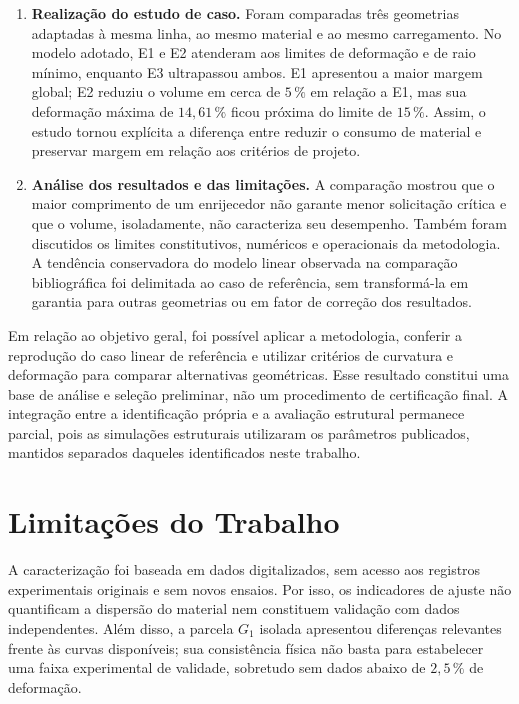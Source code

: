 \documentclass[arial,centeredequations,english,brazilian,oneside,section=TITLE]{ifes8}
\begin{document}
\begin{enumerate}
  \item \textbf{Realização do estudo de caso.} Foram comparadas três
  geometrias adaptadas à mesma linha, ao mesmo material e ao mesmo
  carregamento. No modelo adotado, E1 e E2 atenderam aos limites de
  deformação e de raio mínimo, enquanto E3 ultrapassou ambos. E1
  apresentou a maior margem global; E2 reduziu o volume em cerca de
  $5\,\%$ em relação a E1, mas sua deformação máxima de $14{,}61\,\%$
  ficou próxima do limite de $15\,\%$. Assim, o estudo tornou explícita
  a diferença entre reduzir o consumo de material e preservar margem
  em relação aos critérios de projeto.

  \item \textbf{Análise dos resultados e das limitações.} A comparação
  mostrou que o maior comprimento de um enrijecedor não garante menor
  solicitação crítica e que o volume, isoladamente, não caracteriza
  seu desempenho. Também foram discutidos os limites constitutivos,
  numéricos e operacionais da metodologia. A tendência conservadora
  do modelo linear observada na comparação bibliográfica foi
  delimitada ao caso de referência, sem transformá-la em garantia
  para outras geometrias ou em fator de correção dos resultados.
\end{enumerate}

Em relação ao objetivo geral, foi possível aplicar a metodologia,
conferir a reprodução do caso linear de referência e utilizar critérios
de curvatura e deformação para comparar alternativas geométricas. Esse
resultado constitui uma base de análise e seleção preliminar, não um
procedimento de certificação final. A integração entre a identificação
própria e a avaliação estrutural permanece parcial, pois as simulações
estruturais utilizaram os parâmetros publicados, mantidos separados
daqueles identificados neste trabalho.

\section{Limitações do Trabalho}
\label{sec:limitacoes-trabalho}

A caracterização foi baseada em dados digitalizados, sem acesso aos
registros experimentais originais e sem novos ensaios. Por isso, os
indicadores de ajuste não quantificam a dispersão do material nem
constituem validação com dados independentes. Além disso, a parcela
$G_1$ isolada apresentou diferenças relevantes frente às curvas
disponíveis; sua consistência física não basta para estabelecer uma
faixa experimental de validade, sobretudo sem dados abaixo de
$2{,}5\,\%$ de deformação.
\end{document}
